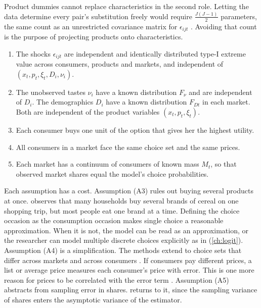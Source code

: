 Product dummies cannot replace characteristics in the second role. Letting the data determine every pair's
substitution freely would require $\frac{J(J-1)}{2}$ parameters, the same count as an unrestricted covariance
matrix for $\epsilon_{ijt}$ \citep[p.~528]{Nevo2000a}. Avoiding that count is the purpose of projecting
products onto characteristics.

\begin{assumption}\label{ass:08-rc}
\leavevmode
\begin{enumerate}[label=(A\arabic*)]
  \item The shocks $\epsilon_{ijt}$ are independent and identically distributed type-I extreme value across
    consumers, products and markets, and independent of $(x_t, p_t, \xi_t, D_i, \nu_i)$.
  \item The unobserved tastes $\nu_i$ have a known distribution $F_\nu$ and are independent of $D_i$. The
    demographics $D_i$ have a known distribution $F_{Dt}$ in each market. Both are independent of the product
    variables $(x_t, p_t, \xi_t)$.
  \item Each consumer buys one unit of the option that gives her the highest utility.
  \item All consumers in a market face the same choice set and the same prices.
  \item Each market has a continuum of consumers of known mass $M_t$, so that observed market shares equal
    the model's choice probabilities.
\end{enumerate}
\end{assumption}

Each assumption has a cost. Assumption (A3) rules out buying several products at once. \citet[n.~13]{Nevo2001}
observes that many households buy several brands of cereal on one shopping trip, but most people eat one
brand at a time. Defining the choice occasion as the consumption occasion makes single choice a reasonable
approximation. When it is not, the model can be read as an approximation, or the researcher can model multiple
discrete choices explicitly as in \citet{Hendel1999} (\cref{ch:logit}). Assumption (A4) is a simplification.
The methods extend to choice sets that differ across markets and across consumers \citep[n.~8]{Nevo2000a}. If
consumers pay different prices, a list or average price measures each consumer's price with error. This is
one more reason for prices to be correlated with the error term \citep[p.~518]{Nevo2000a}. Assumption (A5)
abstracts from sampling error in shares.  returns to it, since the sampling variance of
shares enters the asymptotic variance of the estimator.

